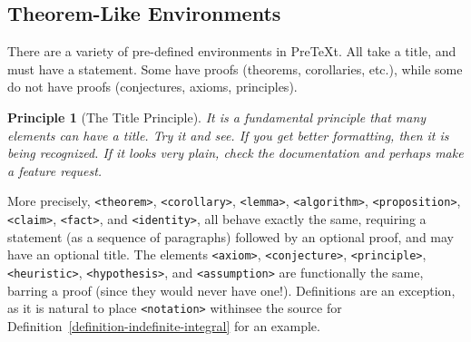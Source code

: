 \documentclass[pdflatex]{sn-jnl}
\theoremstyle{thmstyleone}%
\theoremstyle{thmstyletwo}%
\newtheorem{principle}[theorem]{Principle}
\theoremstyle{thmstylethree}%
\newcommand{\xreffont}{\relax}
\newcommand{\mono}[1]{\texttt{#1}}
\numberwithin{equation}{section}
\begin{document}
\subsection{Theorem-Like Environments}\label{section-interesting-corollary-6}%
There are a variety of pre-defined environments in PreTeXt.  All take a title, and must have a statement.  Some have proofs (theorems, corollaries, etc.\@), while some do not have proofs (conjectures, axioms, principles).%
\begin{principle}[The Title Principle]\label{principle-principle}%
%
It is a fundamental principle that many elements can have a title.  Try it and see. If you get better formatting, then it is being recognized.  If it looks very plain, check the documentation and perhaps make a feature request.%
\end{principle}
More precisely, \mono{<theorem>}, \mono{<corollary>}, \mono{<lemma>}, \mono{<algorithm>}, \mono{<proposition>}, \mono{<claim>}, \mono{<fact>}, and \mono{<identity>}, all behave exactly the same, requiring a statement (as a sequence of paragraphs) followed by an optional proof, and may have an optional title.  The elements \mono{<axiom>}, \mono{<conjecture>}, \mono{<principle>}, \mono{<heuristic>}, \mono{<hypothesis>}, and \mono{<assumption>} are functionally the same, barring a proof (since they would never have one!).  Definitions are an exception, as it is natural to place \mono{<notation>} within\textemdash{}see the source for Definition~\hyperref[definition-indefinite-integral]{{\xreffont\ref{definition-indefinite-integral}}} for an example.%
%
%
\typeout{************************************************}
\typeout{************************************************}
%
\end{document}
